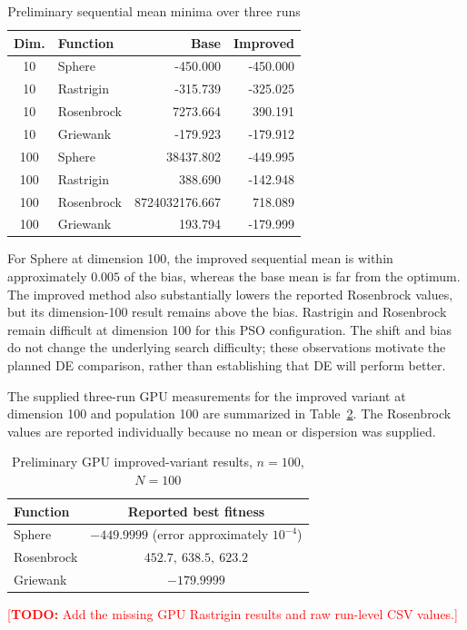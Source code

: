 \documentclass[conference]{IEEEtran}
\newcommand{\todo}[1]{\textcolor{red}{[\textbf{TODO:} #1]}}
\begin{document}
\begin{table}[t]
\centering
\caption{Preliminary sequential mean minima over three runs}
\label{tab:seq-preliminary}
\begin{tabular}{clrr}
\toprule
\textbf{Dim.} & \textbf{Function} & \textbf{Base} & \textbf{Improved}\\
\midrule
10 & Sphere     & -450.000 & -450.000\\
10 & Rastrigin  & -315.739 & -325.025\\
10 & Rosenbrock & 7273.664 & 390.191\\
10 & Griewank   & -179.923 & -179.912\\
\midrule
100 & Sphere     & 38437.802 & -449.995\\
100 & Rastrigin  & 388.690 & -142.948\\
100 & Rosenbrock & 8724032176.667 & 718.089\\
100 & Griewank   & 193.794 & -179.999\\
\bottomrule
\end{tabular}
\end{table}

For Sphere at dimension 100, the improved sequential mean is within
approximately $0.005$ of the bias, whereas the base mean is far from the
optimum. The improved method also substantially lowers the reported
Rosenbrock values, but its dimension-100 result remains above the bias.
Rastrigin and Rosenbrock remain difficult at dimension 100 for this PSO
configuration. The shift and bias do not change the underlying search
difficulty; these observations motivate the planned DE comparison, rather
than establishing that DE will perform better.

The supplied three-run GPU measurements for the improved variant at
dimension 100 and population 100 are summarized in
Table~\ref{tab:gpu-preliminary}. The Rosenbrock values are reported
individually because no mean or dispersion was supplied.
\begin{table}[t]
\centering
\caption{Preliminary GPU improved-variant results, $n=100$, $N=100$}
\label{tab:gpu-preliminary}
\begin{tabular}{lc}
\toprule
\textbf{Function} & \textbf{Reported best fitness}\\
\midrule
Sphere & $-449.9999$ (error approximately $10^{-4}$)\\
Rosenbrock & $452.7,\ 638.5,\ 623.2$\\
Griewank & $-179.9999$\\
\bottomrule
\end{tabular}
\end{table}
\todo{Add the missing GPU Rastrigin results and raw run-level CSV values.}
\end{document}
